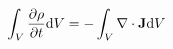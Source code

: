 \documentclass[preview]{standalone}
\begin{document}
\begin{align*}
\int_{V}\pdv{\rho}{t}\dd V = -\int_V \nabla \cdot \mathbf{J}\dd V
\end{align*}
\end{document}
